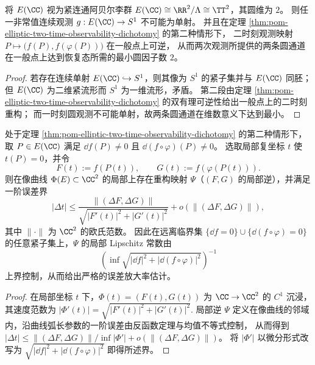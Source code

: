 \begin{proposition}[椭圆环面的圆维与最小双通道可观测性]\label{prop:pom-elliptic-circle-dimension-minimality}
将 \(E(\CC)\) 视为紧连通阿贝尔李群 \(E(\CC)\cong \RR^2/\Lambda\cong \TT^2\)，其圆维为 \(2\)。
则任一非常值连续观测 \(g:E(\CC)\to S^1\) 不可能为单射。
并且在定理 \ref{thm:pom-elliptic-two-time-observability-dichotomy} 的第二种情形下，
二时刻观测映射 \(P\mapsto\bigl(f(P),f(\varphi(P))\bigr)\) 在一般点上可逆，
从而两次观测所提供的两条圆通道在一般点上达到恢复态所需的最小圆因子数 \(2\)。
\end{proposition}
\begin{proof}
若存在连续单射 \(E(\CC)\hookrightarrow S^1\)，则其像为 \(S^1\) 的紧子集并与 \(E(\CC)\) 同胚；
但 \(E(\CC)\) 为二维紧流形而 \(S^1\) 为一维流形，矛盾。
第二段由定理 \ref{thm:pom-elliptic-two-time-observability-dichotomy} 的双有理可逆性给出一般点上的二时刻重构；
而一时刻圆观测不可能单射，故两条圆通道在维数意义下达到最小。
\end{proof}

\begin{proposition}[双时刻重构的局部误差放大界]\label{prop:pom-two-time-reconstruction-condition-number}
处于定理 \ref{thm:pom-elliptic-two-time-observability-dichotomy} 的第二种情形下，
取 \(P\in E(\CC)\) 满足 \(\dd f(P)\neq 0\) 且 \(\dd(f\circ\varphi)(P)\neq 0\)。
选取局部复坐标 \(t\) 使 \(t(P)=0\)，并令
\[
F(t):=f(P(t)),\qquad G(t):=f(\varphi(P(t))).
\]
则在像曲线 \(\Phi(E)\subset \CC^2\) 的局部上存在重构映射 \(\Psi\)（\((F,G)\) 的局部逆），并满足一阶误差界
\[
|\Delta t|
\le
\frac{\bigl\|(\Delta F,\Delta G)\bigr\|}{\sqrt{|F'(t)|^2+|G'(t)|^2}}
 + o\!\left(\bigl\|(\Delta F,\Delta G)\bigr\|\right),
\]
其中 \(\|\cdot\|\) 为 \(\CC^2\) 的欧氏范数。
因此在远离临界集 \(\{\dd f=0\}\cup\{\dd(f\circ\varphi)=0\}\) 的任意紧子集上，\(\Psi\) 的局部 Lipschitz 常数由
\[
\left(\inf \sqrt{|\dd f|^2+|\dd(f\circ\varphi)|^2}\right)^{-1}
\]
上界控制，从而给出严格的误差放大率估计。
\end{proposition}
\begin{proof}
在局部坐标 \(t\) 下，\(\Phi(t)=(F(t),G(t))\) 为 \(\CC\to\CC^2\) 的 \(C^1\) 沉浸，其速度范数为
\(
|\Phi'(t)|=\sqrt{|F'(t)|^2+|G'(t)|^2}.
\)
局部逆 \(\Psi\) 定义在像曲线的邻域内，沿曲线弧长参数的一阶误差由反函数定理与均值不等式控制，
从而得到 \(|\Delta t|\le \|(\Delta F,\Delta G)\|/\inf|\Phi'|+o(\|(\Delta F,\Delta G)\|)\)。
将 \(|\Phi'|\) 以微分形式改写为 \(\sqrt{|\dd f|^2+|\dd(f\circ\varphi)|^2}\) 即得所述界。
\end{proof}
